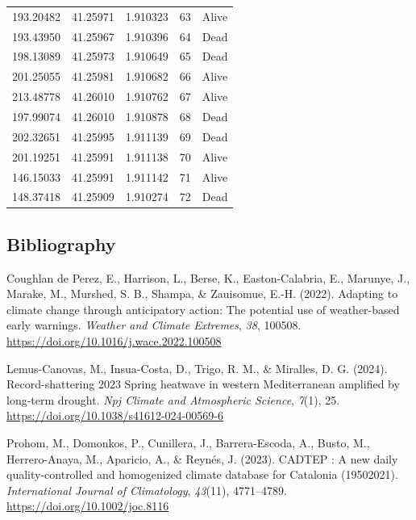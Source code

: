 \documentclass[
]{article}
\newlength{\cslhangindent}
\newenvironment{CSLReferences}[2] %
 {\begin{list}{}{%
  \setlength{\itemindent}{0pt}
  \setlength{\leftmargin}{0pt}
  \setlength{\parsep}{0pt}
  \ifodd #1
   \setlength{\leftmargin}{\cslhangindent}
   \setlength{\itemindent}{-1\cslhangindent}
  \fi
  \setlength{\itemsep}{#2\baselineskip}}}
 {\end{list}}
\begin{document}
\begin{longtable}[]{@{}ccccc@{}}
193.20482 & 41.25971 & 1.910323 & 63 & Alive \\
193.43950 & 41.25967 & 1.910396 & 64 & Dead \\
198.13089 & 41.25973 & 1.910649 & 65 & Dead \\
201.25055 & 41.25981 & 1.910682 & 66 & Alive \\
213.48778 & 41.26010 & 1.910762 & 67 & Alive \\
197.99074 & 41.26010 & 1.910878 & 68 & Dead \\
202.32651 & 41.25995 & 1.911139 & 69 & Dead \\
201.19251 & 41.25991 & 1.911138 & 70 & Alive \\
146.15033 & 41.25991 & 1.911142 & 71 & Alive \\
148.37418 & 41.25909 & 1.910274 & 72 & Dead \\
\end{longtable}

\newpage

\subsection*{Bibliography}\label{bibliography}

\label{refs}
\begin{CSLReferences}{1}{0}
Coughlan de Perez, E., Harrison, L., Berse, K., Easton-Calabria, E.,
Marunye, J., Marake, M., Murshed, S. B., Shampa, \& Zauisomue, E.-H.
(2022). Adapting to climate change through anticipatory action: The
potential use of weather-based early warnings. \emph{Weather and Climate
Extremes}, \emph{38}, 100508.
\url{https://doi.org/10.1016/j.wace.2022.100508}

Lemus-Canovas, M., Insua-Costa, D., Trigo, R. M., \& Miralles, D. G.
(2024). Record-shattering 2023 Spring heatwave in western Mediterranean
amplified by long-term drought. \emph{Npj Climate and Atmospheric
Science}, \emph{7}(1), 25.
\url{https://doi.org/10.1038/s41612-024-00569-6}

Prohom, M., Domonkos, P., Cunillera, J., Barrera-Escoda, A., Busto, M.,
Herrero-Anaya, M., Aparicio, A., \& Reynés, J. (2023). CADTEP : A new
daily quality{-}controlled and homogenized climate database for
Catalonia (1950{\textendash}2021). \emph{International Journal of
Climatology}, \emph{43}(11), 4771--4789.
\url{https://doi.org/10.1002/joc.8116}

\end{CSLReferences}
\end{document}

